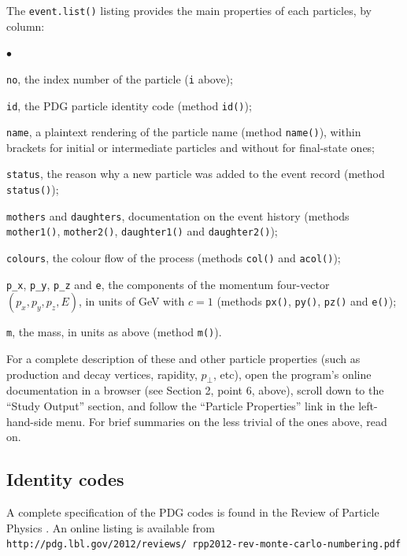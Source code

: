 \documentclass[12pt,a4paper]{article}
\newenvironment{Itemize}{\begin{list}{$\bullet$}%
{\setlength{\topsep}{0.4mm}\setlength{\partopsep}{0.4mm}%
\setlength{\itemsep}{0.4mm}\setlength{\parsep}{0.4mm}}}%
{\end{list}}
\begin{document}
The \texttt{event.list()} listing provides the main properties of 
each particles, by column:
\begin{Itemize}
\item \texttt{no}, the index number of the particle (\texttt{i}
above);
\item \texttt{id}, the PDG particle identity code 
(method \texttt{id()});
\item \texttt{name}, a plaintext rendering of the particle name 
(method \texttt{name()}), within brackets for initial or intermediate 
particles and without for final-state ones;
\item \texttt{status}, the reason why a new particle was added to 
the event record (method \texttt{status()});
\item \texttt{mothers} and \texttt{daughters}, documentation on
the event history (methods \texttt{mother1()}, \texttt{mother2()}, 
\texttt{daughter1()} and \texttt{daughter2()});
\item \texttt{colours}, the colour flow of the process (methods 
\texttt{col()} and \texttt{acol()});
\item \texttt{p\_x}, \texttt{p\_y}, \texttt{p\_z} and \texttt{e}, 
the components of the momentum four-vector $(p_x, p_y, p_z, E)$,
in units of GeV with $c = 1$ (methods \texttt{px()}, \texttt{py()}, 
\texttt{pz()} and \texttt{e()});
\item \texttt{m}, the mass, in units as above (method \texttt{m()}).
\end{Itemize}
For a complete description of these and other particle properties 
(such as production and decay vertices, rapidity, $p_\perp$, etc), 
open the program's online documentation in a browser (see Section 2,
point 6, above), scroll down to the ``Study Output'' section, and follow
the ``Particle Properties'' link in the left-hand-side menu.  For brief
summaries on the less trivial of the ones above, read on.

\subsection{Identity codes}

A complete specification of the PDG codes is found in the
Review of Particle Physics \cite{rpp}. An online listing is 
available from\\
\hspace*{10mm}\texttt{http://pdg.lbl.gov/2012/reviews/%
rpp2012-rev-monte-carlo-numbering.pdf}
\end{document}
